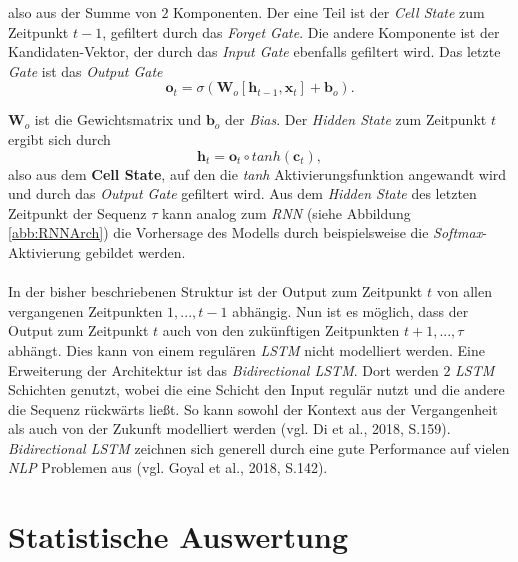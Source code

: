 \documentclass[a4paper,11pt]{article}
\begin{document}
also aus der Summe von $2$ Komponenten. Der eine Teil ist der \textit{Cell State} zum Zeitpunkt $t-1$, gefiltert durch das \textit{Forget Gate}. Die andere Komponente ist der Kandidaten-Vektor, der durch das \textit{Input Gate} ebenfalls gefiltert wird.
Das letzte \textit{Gate} ist das \textit{Output Gate} 
\[  \bm{o}_t = \sigma(\bm{W}_o [\bm{h}_{t-1}, \bm{x}_t] + \bm{b}_o).\]

$\bm{W}_o$ ist die Gewichtsmatrix und $\bm{b}_o$ der \textit{Bias}. Der \textit{Hidden State} zum Zeitpunkt $t$ ergibt sich durch
\[\bm{h}_t = \bm{o}_t \circ tanh(\bm{c}_t) , \]
also aus dem \textbf{Cell State}, auf den die \textit{tanh} Aktivierungsfunktion angewandt wird und durch das \textit{Output Gate} gefiltert wird. Aus dem \textit{Hidden State} des letzten Zeitpunkt der Sequenz $\tau$ kann analog zum \textit{RNN} (siehe Abbildung \ref{abb:RNNArch}) die Vorhersage des Modells durch beispielsweise die \textit{Softmax}-Aktivierung gebildet werden. \\
\\
In der bisher beschriebenen Struktur ist der Output zum Zeitpunkt $t$ von allen vergangenen Zeitpunkten $1,...,t-1$ abhängig. Nun ist es möglich, dass der Output zum Zeitpunkt $t$ auch von den zukünftigen Zeitpunkten $t+1,..., \tau$ abhängt. Dies kann von einem regulären \textit{LSTM} nicht modelliert werden. Eine Erweiterung der Architektur ist das \textit{Bidirectional LSTM}. Dort werden $2$ \textit{LSTM} Schichten genutzt, wobei die eine Schicht den Input regulär nutzt und die andere die Sequenz rückwärts ließt. So kann sowohl der Kontext aus der Vergangenheit als auch von der Zukunft modelliert werden (vgl. Di et al., 2018, S.159).
\textit{Bidirectional LSTM} zeichnen sich generell durch eine gute Performance auf vielen \textit{NLP} Problemen aus (vgl. Goyal et al., 2018, S.142).


\newpage

\section{Statistische Auswertung}\label{Kap:statAus}
\end{document}
